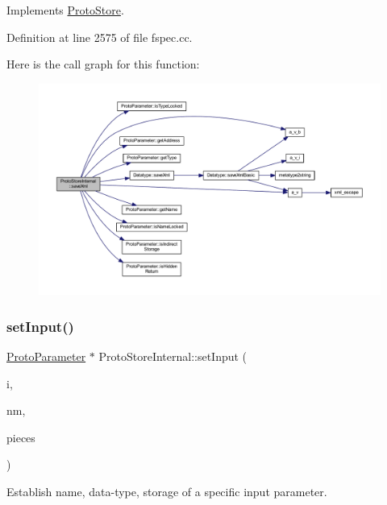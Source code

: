 Implements \mbox{\hyperlink{class_proto_store_ac6e8cc6bfcb10d84a69c3f6011c5de06}{Proto\+Store}}.



Definition at line 2575 of file fspec.\+cc.

Here is the call graph for this function\+:
\nopagebreak
\begin{figure}[H]
\begin{center}
\leavevmode
\includegraphics[width=350pt]{class_proto_store_internal_a1ad86117b6c4aaace47788adaef58880_cgraph}
\end{center}
\end{figure}
\mbox{\label{class_proto_store_internal_a37baf5313582d2748bc012b95a651076}} 
\subsubsection{\texorpdfstring{setInput()}{setInput()}}
{\footnotesize\ttfamily \mbox{\hyperlink{class_proto_parameter}{Proto\+Parameter}} $\ast$ Proto\+Store\+Internal\+::set\+Input (\begin{DoxyParamCaption}\item[{int4}]{i,  }\item[{const string \&}]{nm,  }\item[{const \mbox{\hyperlink{struct_parameter_pieces}{Parameter\+Pieces}} \&}]{pieces }\end{DoxyParamCaption})\hspace{0.3cm}{\ttfamily [virtual]}}



Establish name, data-\/type, storage of a specific input parameter. 

